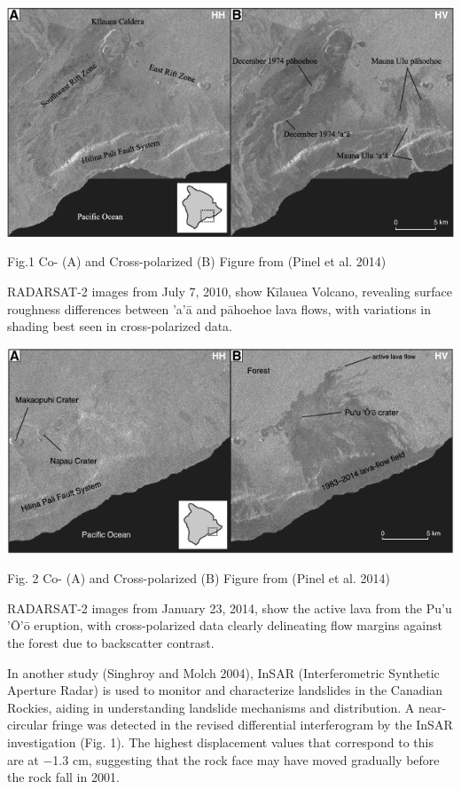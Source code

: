 \documentclass[
  letterpaper,
  DIV=11,
  numbers=noendperiod]{scrreprt}
\begin{document}
\includegraphics{Cross-polarized1.png}

Fig.1 Co- (A) and Cross-polarized (B) Figure from (Pinel et al. 2014)

RADARSAT-2 images from July 7, 2010, show Kīlauea Volcano, revealing
surface roughness differences between 'a'ā and pāhoehoe lava flows, with
variations in shading best seen in cross-polarized data.

\includegraphics{Cross-polarized2.png}

Fig. 2 Co- (A) and Cross-polarized (B) Figure from (Pinel et al. 2014)

RADARSAT-2 images from January 23, 2014, show the active lava from the
Pu'u 'Ō'ō eruption, with cross-polarized data clearly delineating flow
margins against the forest due to backscatter contrast.

In another study (Singhroy and Molch 2004), InSAR (Interferometric
Synthetic Aperture Radar) is used to monitor and characterize landslides
in the Canadian Rockies, aiding in understanding landslide mechanisms
and distribution. A near-circular fringe was detected in the revised
differential interferogram by the InSAR investigation (Fig. 1). The
highest displacement values that correspond to this are at −1.3 cm,
suggesting that the rock face may have moved gradually before the rock
fall in 2001.
\end{document}
